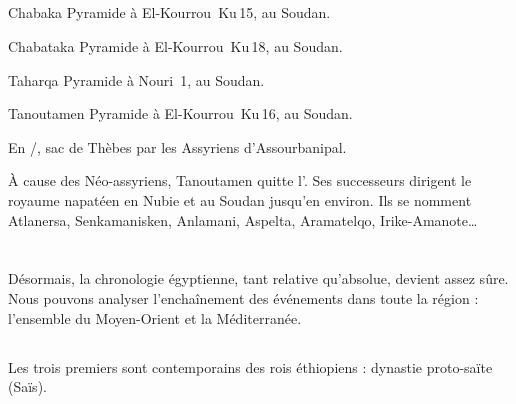 \subsection{\texorpdfstring{}{XXVe dynastie}}

\begin{listerois}
  \item [Chabaka \datation{(c.~\anorange{716}{702})}] 
        Pyramide à El-Kourrou~Ku\,15, au Soudan.
  \item [Chabataka \datation{(c.~\anorange{702}{690})}] 
        Pyramide à El-Kourrou~Ku\,18, au Soudan.
  \item [Taharqa \datation{(c.~\anorange{690}{664})}] 
        Pyramide à Nouri~\num{1}, au Soudan.
  \item [Tanoutamen \datation{(c.~\anorange{664}{656})}] 
        Pyramide à El-Kourrou~Ku\,16, au Soudan.
\end{listerois}

En /, sac de Thèbes par les Assyriens 
d'Assourbanipal.

À cause des Néo-assyriens, Tanoutamen quitte l'\kmt. 
Ses successeurs dirigent le royaume napatéen en Nubie et au Soudan 
jusqu'en  environ.
Ils se nomment Atlanersa, Senkamanisken, Anlamani, Aspelta, 
Aramatelqo, Irike-Amanote\dots

\section{\LP}

Désormais, la chronologie égyptienne, tant relative qu'absolue, 
devient assez sûre. Nous pouvons analyser l'enchaînement des 
événements dans toute la région : l'ensemble du Moyen-Orient et 
la Méditerranée.

\subsection{\texorpdfstring{}{XXVIe dynastie}}


Les trois premiers sont contemporains des rois éthiopiens : dynastie 
\og proto-saïte \fg (Saïs).


